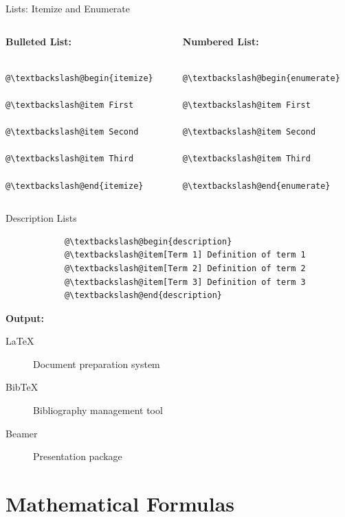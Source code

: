 \documentclass[aspectratio=169]{beamer}
\begin{document}
	\begin{frame}[fragile]{Lists: Itemize and Enumerate}
		\begin{columns}[t]
			\begin{column}{0.48\textwidth}
				\textbf{Bulleted List:}
				\begin{lstlisting}
					@\textbackslash@begin{itemize}
					@\textbackslash@item First
					@\textbackslash@item Second
					@\textbackslash@item Third
					@\textbackslash@end{itemize}
				\end{lstlisting}
			\end{column}
			
			\begin{column}{0.48\textwidth}
				\textbf{Numbered List:}
				\begin{lstlisting}
					@\textbackslash@begin{enumerate}
					@\textbackslash@item First
					@\textbackslash@item Second
					@\textbackslash@item Third
					@\textbackslash@end{enumerate}
				\end{lstlisting}
			\end{column}
		\end{columns}
	\end{frame}
	
	\begin{frame}[fragile]{Description Lists}
		\begin{lstlisting}
			@\textbackslash@begin{description}
			@\textbackslash@item[Term 1] Definition of term 1
			@\textbackslash@item[Term 2] Definition of term 2
			@\textbackslash@item[Term 3] Definition of term 3
			@\textbackslash@end{description}
		\end{lstlisting}
		
		\vspace{1em}
		
		\textbf{Output:}
		\begin{description}
			\item[LaTeX] Document preparation system
			\item[BibTeX] Bibliography management tool
			\item[Beamer] Presentation package
		\end{description}
	\end{frame}
	
	\section{Mathematical Formulas}
	
\end{document}
